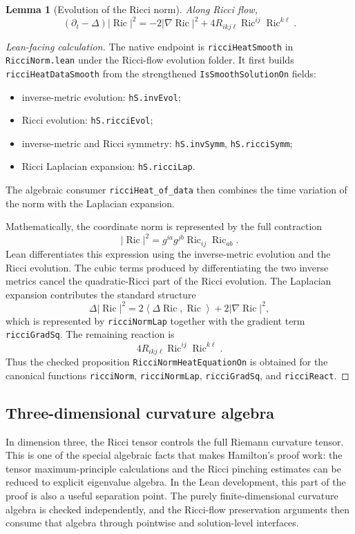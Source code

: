 \documentclass[11pt]{article}
\theoremstyle{plain}
\newtheorem{lemma}[theorem]{Lemma}
\theoremstyle{definition}
\theoremstyle{remark}
\newcommand{\Ric}{\operatorname{Ric}}
\newcommand{\ip}[2]{\left\langle #1,#2\right\rangle}
\newcommand{\norm}[1]{\left|#1\right|}
\newcommand{\leanref}[1]{\nolinkurl{#1}}
\newcommand{\leanfile}[1]{\nolinkurl{#1}}
\newcommand{\rffile}[1]{\leanfile{#1}}
\begin{document}
\begin{lemma}[Evolution of the Ricci norm]
\label{lem:evol-ricci-norm}
Along Ricci flow,
\[
(\partial_t-\Delta)\norm{\Ric}^2
=
-2\norm{\nabla\Ric}^2
+4R_{ikj\ell}\Ric^{ij}\Ric^{k\ell}.
\]
\end{lemma}

\begin{proof}[Lean-facing calculation]
The native endpoint is \leanref{ricciHeatSmooth} in \rffile{RicciNorm.lean}
under the Ricci-flow evolution folder.  It first builds
\leanref{ricciHeatDataSmooth} from the strengthened
\leanref{IsSmoothSolutionOn} fields:
\begin{itemize}[leftmargin=2em]
  \item inverse-metric evolution: \leanref{hS.invEvol};
  \item Ricci evolution: \leanref{hS.ricciEvol};
  \item inverse-metric and Ricci symmetry: \leanref{hS.invSymm},
    \leanref{hS.ricciSymm};
  \item Ricci Laplacian expansion: \leanref{hS.ricciLap}.
\end{itemize}
The algebraic consumer \leanref{ricciHeat_of_data} then combines the time
variation of the norm with the Laplacian expansion.

Mathematically, the coordinate norm is represented by the full contraction
\[
  \norm{\Ric}^2=g^{ia}g^{jb}\Ric_{ij}\Ric_{ab}.
\]
Lean differentiates this expression using the inverse-metric evolution and the
Ricci evolution.  The cubic terms produced by differentiating the two inverse
metrics cancel the quadratic-Ricci part of the Ricci evolution.  The Laplacian
expansion contributes the standard structure
\[
  \Delta\norm{\Ric}^2
  =2\ip{\Delta\Ric}{\Ric}+2\norm{\nabla\Ric}^2,
\]
which is represented by \leanref{ricciNormLap} together with the gradient term
\leanref{ricciGradSq}.  The remaining reaction is
\[
  4R_{ikj\ell}\Ric^{ij}\Ric^{k\ell}.
\]
Thus the checked proposition \leanref{RicciNormHeatEquationOn} is obtained for
the canonical functions \leanref{ricciNorm}, \leanref{ricciNormLap},
\leanref{ricciGradSq}, and \leanref{ricciReact}.
\end{proof}

\subsection{Three-dimensional curvature algebra}

In dimension three, the Ricci tensor controls the full Riemann curvature tensor.
This is one of the special algebraic facts that makes Hamilton's proof work:
the tensor maximum-principle calculations and the Ricci pinching estimates can
be reduced to explicit eigenvalue algebra.  In the Lean development, this part
of the proof is also a useful separation point.  The purely finite-dimensional
curvature algebra is checked independently, and the Ricci-flow preservation
arguments then consume that algebra through pointwise and solution-level
interfaces.
\end{document}
